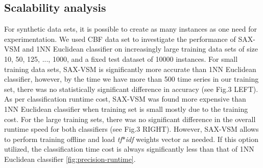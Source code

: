 \documentclass{llncs}
\begin{document}
\subsection{Scalability analysis}
For synthetic data sets, it is possible to create as many instances as one need for experimentation.
We used CBF data set \cite{cbf} to investigate the performance of SAX-VSM and 1NN Euclidean
classifier on increasingly large training data sets of size 10, 50, 125, ..., 1000, and a fixed test
dataset of 10000 instances. For small training data sets, SAX-VSM is signiﬁcantly more accurate
than 1NN Euclidean classifier, however, by the time we have more than 500 time series in
our training set, there was no statistically signiﬁcant diﬀerence in accuracy (see Fig.3 LEFT). 
As per classification runtime cost, SAX-VSM was found more expensive than 1NN Euclidean classifier
when training set is small mostly due to the training cost. For the large training sets, there was
no significant difference in the overall runtime speed for both classifiers  (see Fig.3 RIGHT). 
However, SAX-VSM allows to perform training offline and load \textit{tf$\ast$idf} weights vector as
needed. If this option utilized, the classification time cost is always significantly less than that
of 1NN Euclidean classifier \ref{fig:precision-runtime}.
\end{document}
